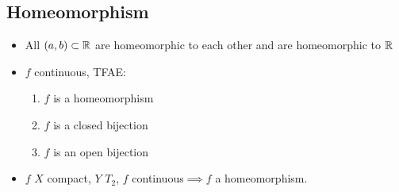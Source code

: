 \documentclass[letterpaper,12pt,fleqn]{article}
\begin{document}
\subsection*{Homeomorphism}

\begin{itemize}
\item All \((a,b)\subset\mathbb{R}\) are homeomorphic to each other and are homeomorphic to \(\mathbb{R}\)

\item \(f\) continuous, TFAE:
  \begin{enumerate}
  \item \(f\) is a homeomorphism
  \item \(f\) is a closed bijection
  \item \(f\) is an open bijection
  \end{enumerate}

\item \(f\) \(X\) compact, \(Y\) \(T_2\), \(f\) continuous\(\implies f\) a homeomorphism.
\end{itemize}
\end{document}
